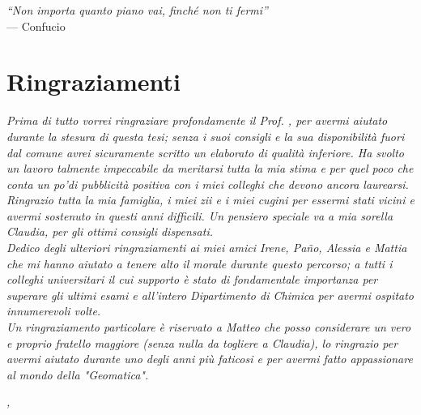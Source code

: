 \cleardoublepage
{}
{}

\begin{flushright}{
    \slshape
    ``Non importa quanto piano vai, finché non ti fermi''} \\
    \medskip
    --- Confucio
\end{flushright}


\bigskip

\begingroup
\let\clearpage\relax
\let\cleardoublepage\relax
\let\cleardoublepage\relax

\chapter*{Ringraziamenti}

\noindent \textit{
    Prima di tutto vorrei ringraziare profondamente il Prof. \myProf, per avermi aiutato durante la stesura di questa tesi; senza i suoi consigli e la sua disponibilità fuori dal comune avrei sicuramente scritto un elaborato di qualità inferiore. Ha svolto un lavoro talmente impeccabile da meritarsi tutta la mia stima e per quel poco che conta un po'di pubblicità positiva con i miei colleghi che devono ancora laurearsi.
    }\\

\noindent \textit{
    Ringrazio tutta la mia famiglia, i miei zii e i miei cugini per essermi stati vicini e avermi sostenuto in questi anni difficili. Un pensiero speciale va a mia sorella Claudia, per gli ottimi consigli dispensati.
    }\\

\noindent \textit{
    Dedico degli ulteriori ringraziamenti ai miei amici Irene, Paño, Alessia e Mattia che mi hanno aiutato a tenere alto il morale durante questo percorso; a tutti i colleghi universitari il cui supporto è stato di fondamentale importanza per superare gli ultimi esami e all'intero Dipartimento di Chimica per avermi ospitato innumerevoli volte.  
    }\\

\noindent \textit{
    Un ringraziamento particolare è riservato a Matteo che posso considerare un vero e proprio fratello maggiore (senza nulla da togliere a Claudia), lo ringrazio per avermi aiutato durante uno degli anni più faticosi e per avermi fatto appassionare al mondo della "Geomatica".
    }\\
\bigskip

\noindent\textit{\myLocation, \myTime}
\hfill \myName

\endgroup

